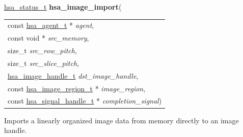 \documentclass[final]{book}
\newcommand{\hsaarg}[1]{\textit{#1}}
\begin{document}
\begin{appendices}
\noindent\begin{tcolorbox}[breakable,nobeforeafter,colframe=white,colback=lightgray,left=0mm]
\hyperlink{group--status-1gad755322e7ff95456520e8abdbe90d225}{hsa_status_t} \hypertarget{group--images-1ga1cd1d33a397f40955958b2ce89e32882}{\textbf{hsa_image_import}}(
\vspace{-3.5mm}\begin{longtable}{@{}p{\textwidth}}
\hspace{1.7em}const \hyperlink{group--topology-1gab8db3fb886332a24acac08ec361e1d86}{hsa_agent_t} * \hsaarg{agent},\\
\hspace{1.7em}const void * \hsaarg{src_memory},\\
\hspace{1.7em}size_t \hsaarg{src_row_pitch},\\
\hspace{1.7em}size_t \hsaarg{src_slice_pitch},\\
\hspace{1.7em}\hyperlink{group--images-1ga0aeecea8e818df4cec2eccb3a5e85d5f}{hsa_image_handle_t} \hsaarg{dst_image_handle},\\
\hspace{1.7em}const \hyperlink{group--images-1ga9d9acd37f7eb5a68c81b63b5ad082529}{hsa_image_region_t} * \hsaarg{image_region},\\
\hspace{1.7em}const \hyperlink{group--signals-1ga6592c136d70853d855bc11d9efdbf534}{hsa_signal_handle_t} * \hsaarg{completion_signal})\end{longtable}

\end{tcolorbox}
Imports a linearly organized image data from memory directly to an image handle.


\end{appendices}
\end{document}
